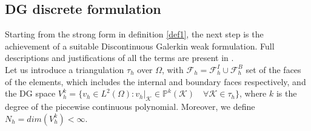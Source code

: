 \documentclass[a4paper,11pt]{article}
\begin{document}
    \subsection{DG discrete formulation}
    Starting from the strong form in definition \ref{def1}, the next step is the achievement of a suitable Discontinuous Galerkin weak formulation. Full descriptions and justifications of all the terms are present in \cite{marta} . \\
    Let us introduce a triangulation $\tau_h$ over $\Omega$, with $\mathcal{F} _h=\mathcal{F} _h^I \cup \mathcal{F} _h^B$ set of the faces of the elements, which includes the internal and boundary faces respectively, and the DG space $V_h^k = \{v_h \in L^2(\Omega) : v_h|_\mathcal{K} \in \mathbb{P}^{k}(\mathcal{K})  \quad \forall \mathcal{K} \in \tau_h \}$, where $k$ is the degree of the piecewise continuous polynomial. Moreover, we define $N_h=dim(V_h^k)<\infty$. \vspace{4mm}
\end{document}
